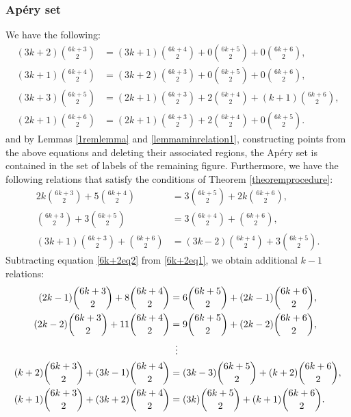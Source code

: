 \documentclass[12pt]{article}
\theoremstyle{remark}
\begin{document}
\subsubsection{Ap{\'e}ry set}
We have the following:
\begin{align}
    (3k+2)\binom{6k+3}{2} &= (3k+1) \binom{6k+4}{2} + 0 \binom{6k+5}{2} + 0\binom{6k+6}{2}, \label{6k+2minrelation0}\\
     (3k+1) \binom{6k+4}{2} &= (3k+2)\binom{6k+3}{2}+ 0 \binom{6k+5}{2} + 0\binom{6k+6}{2}, \label{6k+2minrelation1}\\
     (3k+3) \binom{6k+5}{2} &= (2k+1)\binom{6k+3}{2} + 2\binom{6k+4}{2} + (k+1)\binom{6k+6}{2}, \label{6k+2minrelation2}\\
     (2k+1)\binom{6k+6}{2} &= (2k+1)\binom{6k+3}{2} + 2\binom{6k+4}{2} + 0\binom{6k+5}{2}.\label{6k+2minrelation3}
\end{align}
and by Lemmas \ref{1remlemma} and \ref{lemmaminrelation1}, constructing points from the above equations and deleting their associated regions, the Ap{\'e}ry set is contained in the set of labels of the remaining figure.
Furthermore, we have the following relations that satisfy the conditions of Theorem \ref{theoremprocedure}:
\begin{align}
    2k \binom{6k+3}{2} + 5 \binom{6k+4}{2} &= 3\binom{6k+5}{2} + 2k\binom{6k+6}{2},\label{6k+2eq1}\\
   \binom{6k+3}{2} + 3 \binom{6k+5}{2} &= 3\binom{6k+4}{2} + \binom{6k+6}{2},\label{6k+2eq2}\\
   (3k+1)\binom{6k+3}{2} +  \binom{6k+6}{2} &= (3k-2)\binom{6k+4}{2} + 3\binom{6k+5}{2} .\label{6k+2eq3}
\end{align}
Subtracting equation \eqref{6k+2eq2} from \eqref{6k+2eq1}, we obtain additional $k-1$ relations:
\begin{equation}\label{6k+2_k-1equations_1}
\begin{aligned}  
 (2k-1) \binom{6k+3}{2} + 8 \binom{6k+4}{2} &= 6\binom{6k+5}{2} + (2k-1)\binom{6k+6}{2},\\
 (2k-2) \binom{6k+3}{2} + 11 \binom{6k+4}{2} &= 9\binom{6k+5}{2} + (2k-2)\binom{6k+6}{2},\\
 & \hspace{5.6pt} \vdots\\
 (k+2) \binom{6k+3}{2} + (3k-1) \binom{6k+4}{2} &=  (3k-3)\binom{6k+5}{2} + (k+2)\binom{6k+6}{2},\\
 (k+1) \binom{6k+3}{2} + (3k+2) \binom{6k+4}{2} &=  (3k)\binom{6k+5}{2} + (k+1)\binom{6k+6}{2}.
\end{aligned}
\end{equation}
\end{document}
